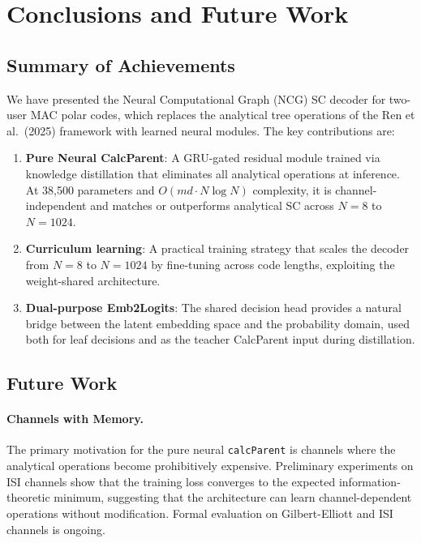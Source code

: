 \documentclass[11pt,a4paper]{article}
\begin{document}
\section{Conclusions and Future Work}
\label{sec:conclusions}

\subsection{Summary of Achievements}

We have presented the Neural Computational Graph (NCG) SC decoder for two-user MAC polar codes, which replaces the analytical tree operations of the Ren et al.\ (2025) framework with learned neural modules. The key contributions are:

\begin{enumerate}
    \item \textbf{Pure Neural CalcParent}: A GRU-gated residual module trained via knowledge distillation that eliminates all analytical operations at inference. At 38,500 parameters and $O(md \cdot N \log N)$ complexity, it is channel-independent and matches or outperforms analytical SC across $N = 8$ to $N = 1024$.

    \item \textbf{Curriculum learning}: A practical training strategy that scales the decoder from $N = 8$ to $N = 1024$ by fine-tuning across code lengths, exploiting the weight-shared architecture.

    \item \textbf{Dual-purpose Emb2Logits}: The shared decision head provides a natural bridge between the latent embedding space and the probability domain, used both for leaf decisions and as the teacher CalcParent input during distillation.
\end{enumerate}

\subsection{Future Work}

\paragraph{Channels with Memory.} The primary motivation for the pure neural \texttt{calcParent} is channels where the analytical operations become prohibitively expensive. Preliminary experiments on ISI channels show that the training loss converges to the expected information-theoretic minimum, suggesting that the architecture can learn channel-dependent operations without modification. Formal evaluation on Gilbert-Elliott and ISI channels is ongoing.
\end{document}
